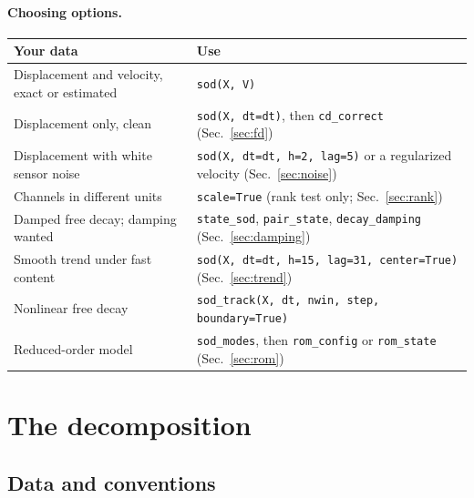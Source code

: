 \documentclass[report]{nld}
\newcommand{\code}[1]{\texttt{#1}}
\begin{document}
\paragraph{Choosing options.}
\begin{center}\small
\begin{tabularx}{\linewidth}{@{}>{\raggedright}p{5.4cm}X@{}}
\toprule
Your data & Use\\
\midrule
Displacement and velocity, exact or estimated & \code{sod(X, V)}\\
Displacement only, clean & \code{sod(X, dt=dt)}, then \code{cd\_correct} (Sec.~\ref{sec:fd})\\
Displacement with white sensor noise & \code{sod(X, dt=dt, h=2, lag=5)} or a regularized velocity (Sec.~\ref{sec:noise})\\
Channels in different units & \code{scale=True} (rank test only; Sec.~\ref{sec:rank})\\
Damped free decay; damping wanted & \code{state\_sod}, \code{pair\_state}, \code{decay\_damping} (Sec.~\ref{sec:damping})\\
Smooth trend under fast content & \code{sod(X, dt=dt, h=15, lag=31, center=True)} (Sec.~\ref{sec:trend})\\
Nonlinear free decay & \code{sod\_track(X, dt, nwin, step, boundary=True)}\\
Reduced-order model & \code{sod\_modes}, then \code{rom\_config} or \code{rom\_state} (Sec.~\ref{sec:rom})\\
\bottomrule
\end{tabularx}
\end{center}

\section{The decomposition}\label{sec:decomposition}

\subsection{Data and conventions}
\end{document}

